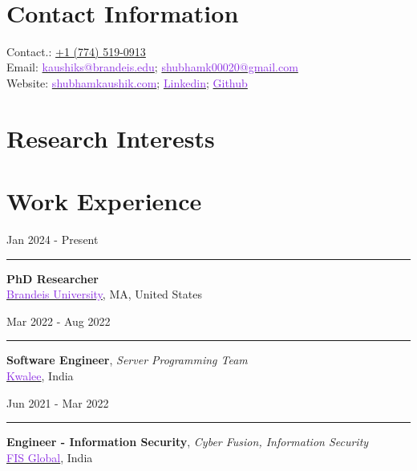 \documentclass[10pt,a4paper,calibri]{moderncv}
\newcommand{\beforesection}{\vspace{-0.5em}}
\newcommand{\mediumspace}{\vspace{0.5em}}
\newcommand{\workexperience}[2]{
  \noindent
  \begin{minipage}[c]{0.20\textwidth}
    \begin{flushright}
      #1      
    \end{flushright}
  \end{minipage}%
  \hspace{0.01\textwidth}
  \begin{minipage}[c]{0.02\textwidth}
    \textcolor{lightgray}{\rule{1pt}{0.7cm}}
  \end{minipage}%
  \begin{minipage}[c]{0.80\textwidth}
    \raggedright{
    #2
    }
  \end{minipage}%
}
\begin{document}
\makecvtitle\

\vspace{-50pt}
\section{Contact Information}

Contact.: \href{tel:+17745190913}{+1 (774) 519-0913}\\
Email: \href{mailto:kaushiks@brandeis.edu}{\textcolor{blueviolet}{kaushiks@brandeis.edu}}\;; 
\href{mailto:shubhamk00020@gmail.com}{\textcolor{blueviolet}{shubhamk00020@gmail.com}}\\
Website: \href{https://www.shubhamkaushik.com}{\textcolor{blueviolet}{shubhamkaushik.com}}\;; 
\href{https://www.linkedin.com/in/shubham-sudo}{\textcolor{blueviolet}{Linkedin}}\;; 
\href{https://www.github.com/shubham-sudo}{\textcolor{blueviolet}{Github}}
\beforesection

\section{Research Interests}

\beforesection

\section{Work Experience}
\workexperience{Jan 2024 \-- Present}{
  \textbf{PhD Researcher}\\
  \href{https://www.brandeis.edu/}{\textcolor{blueviolet}{Brandeis University}}, MA, United States\\
}

\mediumspace

\workexperience{Mar 2022 \-- Aug 2022}{
  \textbf{Software Engineer}, \textit{Server Programming Team}\\
    \href{https://www.kwalee.com/}{\textcolor{blueviolet}{Kwalee}}, India\\
}

\mediumspace

\workexperience{Jun 2021 \-- Mar 2022}{
  \textbf{Engineer \-- Information Security}, \textit{Cyber Fusion, Information Security}\\
    \href{https://www.fisglobal.com/en}{\textcolor{blueviolet}{FIS Global}}, India\\
}
\end{document}
